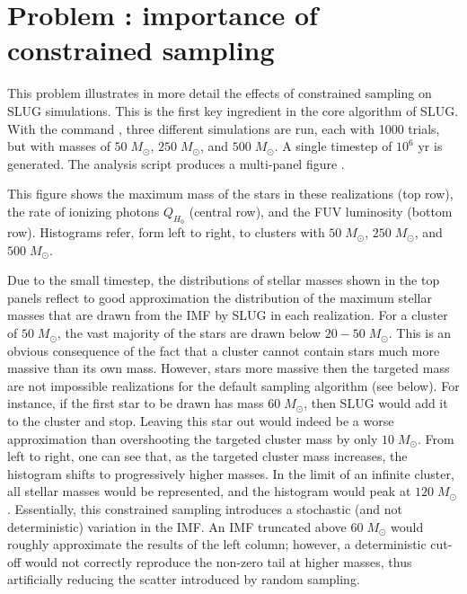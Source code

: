 \documentclass[letterpaper,10pt,english]{sphinxmanual}
\begin{document}
\section{Problem : importance of constrained sampling}
\label{\detokenize{tests:probsampl-label}}\label{\detokenize{tests:problem-constsampl-importance-of-constrained-sampling}}
This problem illustrates in more detail the effects of constrained sampling on SLUG simulations.
This is the first key ingredient in the core algorithm of SLUG. With the command ,
three different  simulations are run, each with 1000 trials, but with masses of \(50\;M_\odot\),
\(250\;M_\odot\), and \(500\;M_\odot\). A single timestep of \(10^6\) yr is generated.
The analysis script  produces a multi-panel
figure .

This figure shows the maximum mass of the stars in these realizations (top row), the
rate of ionizing photons \(Q_{H_0}\) (central row), and the FUV luminosity (bottom row).
Histograms refer, form left to right, to clusters with \(50\;M_\odot\), \(250\;M_\odot\),
and \(500\;M_\odot\).

Due to the small timestep, the distributions of stellar masses shown in the top panels reflect
to good approximation the distribution of the maximum stellar masses that are drawn from the IMF by
SLUG in each realization. For a cluster of \(50\;M_\odot\), the vast majority of the
stars are drawn below  \(20-50\;M_\odot\). This is an obvious consequence of the
fact that a cluster cannot contain stars much more massive than its own mass. However, stars
more massive then the targeted mass are not impossible realizations for the default
sampling algorithm (see below). For instance, if the first star to be drawn has
mass \(60\;M_\odot\), then SLUG would add it to the cluster and stop. Leaving this star out
would indeed be a worse approximation than overshooting the targeted cluster mass by only
\(10\;M_\odot\).  From left to right, one can see that, as the targeted cluster mass increases, the
histogram shifts to progressively higher masses. In the limit of an infinite cluster,
all stellar masses would be represented, and the histogram would peak at \(120\;M_\odot\).
Essentially, this constrained sampling introduces a stochastic (and not deterministic)
variation in the IMF. An IMF truncated above \(60\;M_\odot\) would roughly
approximate the results of the left column; however, a deterministic cut-off
would not correctly reproduce the non-zero tail at higher masses, thus artificially
reducing the scatter introduced by random sampling.
\end{document}
